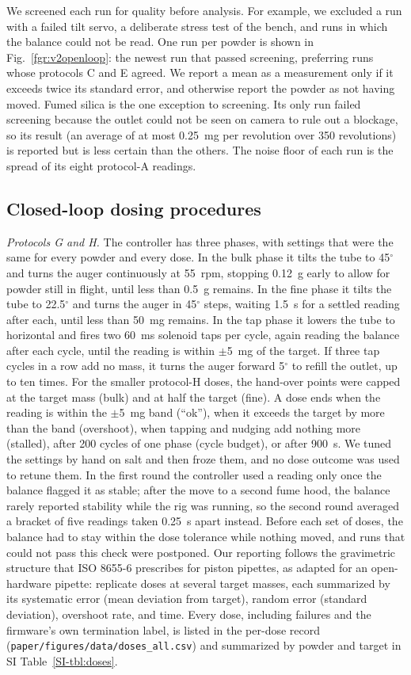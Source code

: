 \documentclass[twoside,twocolumn,9pt]{article}
\newcommand{\siref}[1]{\ref*{SI-#1}}
\begin{document}
We screened each run for quality before analysis. For example, we excluded a run with a failed tilt servo, a deliberate stress test of the bench, and runs in which the balance could not be read. One run per powder is shown in Fig.~\ref{fgr:v2openloop}: the newest run that passed screening, preferring runs whose protocols C and E agreed. We report a mean as a measurement only if it exceeds twice its standard error, and otherwise report the powder as not having moved. Fumed silica is the one exception to screening. Its only run failed screening because the outlet could not be seen on camera to rule out a blockage, so its result (an average of at most 0.25~mg per revolution over 350 revolutions) is reported but is less certain than the others. The noise floor of each run is the spread of its eight protocol-A readings.

\subsection{Closed-loop dosing procedures}
\emph{Protocols G and H.} The controller has three phases, with settings that were the same for every powder and every dose. In the bulk phase it tilts the tube to 45$^\circ$ and turns the auger continuously at 55~rpm, stopping 0.12~g early to allow for powder still in flight, until less than 0.5~g remains. In the fine phase it tilts the tube to 22.5$^\circ$ and turns the auger in 45$^\circ$ steps, waiting 1.5~s for a settled reading after each, until less than 50~mg remains. In the tap phase it lowers the tube to horizontal and fires two 60~ms solenoid taps per cycle, again reading the balance after each cycle, until the reading is within $\pm$5~mg of the target. If three tap cycles in a row add no mass, it turns the auger forward 5$^\circ$ to refill the outlet, up to ten times. For the smaller protocol-H doses, the hand-over points were capped at the target mass (bulk) and at half the target (fine). A dose ends when the reading is within the $\pm$5~mg band (``ok''), when it exceeds the target by more than the band (overshoot), when tapping and nudging add nothing more (stalled), after 200 cycles of one phase (cycle budget), or after 900~s. We tuned the settings by hand on salt and then froze them, and no dose outcome was used to retune them. In the first round the controller used a reading only once the balance flagged it as stable; after the move to a second fume hood, the balance rarely reported stability while the rig was running, so the second round averaged a bracket of five readings taken 0.25~s apart instead. Before each set of doses, the balance had to stay within the dose tolerance while nothing moved, and runs that could not pass this check were postponed. Our reporting follows the gravimetric structure that ISO 8655-6 prescribes for piston pipettes, as adapted for an open-hardware pipette:\cite{Yoshikawa2023Pipette,Yoshikawa2026Commit} replicate doses at several target masses, each summarized by its systematic error (mean deviation from target), random error (standard deviation), overshoot rate, and time. Every dose, including failures and the firmware's own termination label, is listed in the per-dose record (\texttt{paper/figures/data/doses\_all.csv}) and summarized by powder and target in SI Table~\siref{tbl:doses}.
\end{document}
